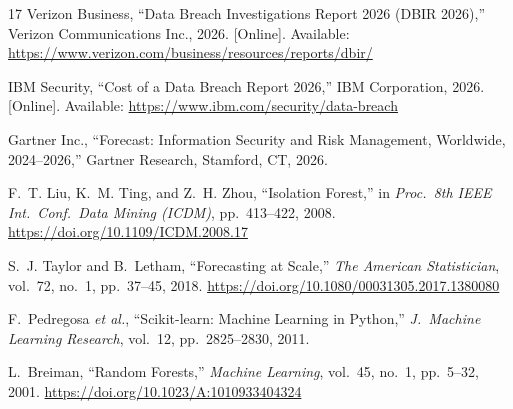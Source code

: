 \documentclass[journal]{IEEEtran}
\begin{document}
\begin{thebibliography}{17}
Verizon Business,
``Data Breach Investigations Report 2026 (DBIR 2026),''
Verizon Communications Inc., 2026.
[Online]. Available: \url{https://www.verizon.com/business/resources/reports/dbir/}

IBM Security,
``Cost of a Data Breach Report 2026,''
IBM Corporation, 2026.
[Online]. Available: \url{https://www.ibm.com/security/data-breach}

Gartner Inc.,
``Forecast: Information Security and Risk Management, Worldwide, 2024--2026,''
Gartner Research, Stamford, CT, 2026.

F.~T. Liu, K.~M. Ting, and Z.~H. Zhou,
``Isolation Forest,''
in \emph{Proc.\ 8th IEEE Int.\ Conf.\ Data Mining (ICDM)},
pp.~413--422, 2008.
\url{https://doi.org/10.1109/ICDM.2008.17}

S.~J. Taylor and B.~Letham,
``Forecasting at Scale,''
\emph{The American Statistician}, vol.~72, no.~1, pp.~37--45, 2018.
\url{https://doi.org/10.1080/00031305.2017.1380080}

F.~Pedregosa \emph{et al.},
``Scikit-learn: Machine Learning in Python,''
\emph{J.\ Machine Learning Research}, vol.~12, pp.~2825--2830, 2011.

L.~Breiman,
``Random Forests,''
\emph{Machine Learning}, vol.~45, no.~1, pp.~5--32, 2001.
\url{https://doi.org/10.1023/A:1010933404324}

\end{thebibliography}
\end{document}
